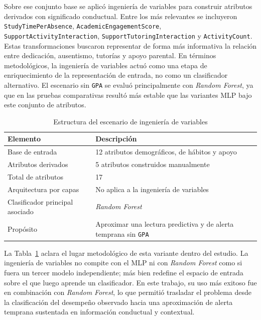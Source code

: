 \documentclass[conference]{IEEEtran}
\begin{document}
Sobre ese conjunto base se aplicó ingeniería de variables para construir atributos derivados con significado conductual. Entre los más relevantes se incluyeron \texttt{StudyTimePerAbsence}, \texttt{AcademicEngagementScore}, \texttt{SupportActivityInteraction}, \texttt{SupportTutoringInteraction} y \texttt{ActivityCount}. Estas transformaciones buscaron representar de forma más informativa la relación entre dedicación, ausentismo, tutorías y apoyo parental. En términos metodológicos, la ingeniería de variables actuó como una etapa de enriquecimiento de la representación de entrada, no como un clasificador alternativo. El escenario sin \texttt{GPA} se evaluó principalmente con \textit{Random Forest}, ya que en las pruebas comparativas resultó más estable que las variantes MLP bajo este conjunto de atributos.

\begin{table}[htbp]
\centering
\caption{Estructura del escenario de ingeniería de variables}
\scriptsize
\setlength{\tabcolsep}{4pt}
\begin{tabular}{p{2.8cm}p{4.4cm}}
\toprule
Elemento & Descripción \\
\midrule
Base de entrada & 12 atributos demográficos, de hábitos y apoyo \\
Atributos derivados & 5 atributos construidos manualmente \\
Total de atributos & 17 \\
Arquitectura por capas & No aplica a la ingeniería de variables \\
Clasificador principal asociado & \textit{Random Forest} \\
Propósito & Aproximar una lectura predictiva y de alerta temprana sin \texttt{GPA} \\
\bottomrule
\end{tabular}
\normalsize
\label{tab:ingenieria_estructura}
\end{table}

La Tabla~\ref{tab:ingenieria_estructura} aclara el lugar metodológico de esta variante dentro del estudio. La ingeniería de variables no compite con el MLP ni con \textit{Random Forest} como si fuera un tercer modelo independiente; más bien redefine el espacio de entrada sobre el que luego aprende un clasificador. En este trabajo, su uso más exitoso fue en combinación con \textit{Random Forest}, lo que permitió trasladar el problema desde la clasificación del desempeño observado hacia una aproximación de alerta temprana sustentada en información conductual y contextual.
\end{document}
